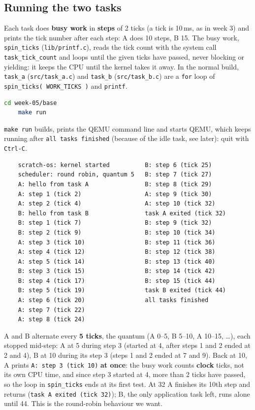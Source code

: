 \subsection{Running the two tasks}
Each task does \textbf{busy work} in \textbf{steps} of 2 ticks (a tick is 10\,ms, as in week 3) and prints the tick number after each step: A does 10 steps, B 15. The busy work, \texttt{spin\_ticks} (\texttt{lib/printf.c}), reads the tick count with the system call \texttt{task\_tick\_count} and loops until the given ticks have passed, never blocking or yielding: it keeps the CPU until the kernel takes it away. In the normal build, \texttt{task\_a} (\texttt{src/task\_a.c}) and \texttt{task\_b} (\texttt{src/task\_b.c}) are a \texttt{for} loop of \texttt{spin\_ticks( WORK\_TICKS )} and \texttt{printf}.
\begin{lstlisting}[language=bash]
    cd week-05/base
    make run
\end{lstlisting}
\texttt{make run} builds, prints the QEMU command line and starts QEMU, which keeps running after \texttt{all tasks finished} (because of the idle task, see later): quit with \texttt{Ctrl-C}.
\begin{verbatim}
    scratch-os: kernel started          B: step 6 (tick 25)
    scheduler: round robin, quantum 5   B: step 7 (tick 27)
    A: hello from task A                B: step 8 (tick 29)
    A: step 1 (tick 2)                  A: step 9 (tick 30)
    A: step 2 (tick 4)                  A: step 10 (tick 32)
    B: hello from task B                task A exited (tick 32)
    B: step 1 (tick 7)                  B: step 9 (tick 32)
    B: step 2 (tick 9)                  B: step 10 (tick 34)
    A: step 3 (tick 10)                 B: step 11 (tick 36)
    A: step 4 (tick 12)                 B: step 12 (tick 38)
    A: step 5 (tick 14)                 B: step 13 (tick 40)
    B: step 3 (tick 15)                 B: step 14 (tick 42)
    B: step 4 (tick 17)                 B: step 15 (tick 44)
    B: step 5 (tick 19)                 task B exited (tick 44)
    A: step 6 (tick 20)                 all tasks finished
    A: step 7 (tick 22)
    A: step 8 (tick 24)
\end{verbatim}
A and B alternate every \textbf{5 ticks}, the quantum (A 0--5, B 5--10, A 10--15, \dots), each stopped mid-step: A at 5 during step 3 (started at 4, after steps 1 and 2 ended at 2 and 4), B at 10 during its step 3 (steps 1 and 2 ended at 7 and 9). Back at 10, A prints \texttt{A: step 3 (tick 10)} \textbf{at once}: the busy work counts \textbf{clock} ticks, not its own CPU time, and since step 3 started at 4, more than 2 ticks have passed, so the loop in \texttt{spin\_ticks} ends at its first test. At 32 A finishes its 10th step and returns (\texttt{task A exited (tick 32)}); B, the only application task left, runs alone until 44. This is the round-robin behaviour we want.

